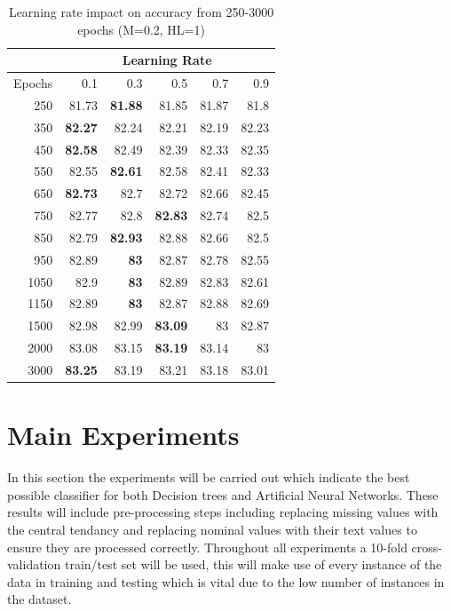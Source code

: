 \documentclass[12pt]{article}
\begin{document}
      \begin{table}[H]
        \centering
        \caption{Learning rate impact on accuracy from 250-3000 epochs (M=0.2, HL=1)}
          \begin{tabular}{r|rrrrr}
          \toprule
                & \multicolumn{5}{c}{Learning Rate} \\
          \midrule
          \multicolumn{1}{l|}{Epochs} & 0.1   & 0.3   & 0.5   & 0.7   & 0.9 \\
          \midrule
          250   & 81.73 & \textbf{81.88} & 81.85 & 81.87 & 81.8 \\
          350   & \textbf{82.27} & 82.24 & 82.21 & 82.19 & 82.23 \\
          450   & \textbf{82.58} & 82.49 & 82.39 & 82.33 & 82.35 \\
          550   & 82.55 & \textbf{82.61} & 82.58 & 82.41 & 82.33 \\
          650   & \textbf{82.73} & 82.7  & 82.72 & 82.66 & 82.45 \\
          750   & 82.77 & 82.8  & \textbf{82.83} & 82.74 & 82.5 \\
          850   & 82.79 & \textbf{82.93} & 82.88 & 82.66 & 82.5 \\
          950   & 82.89 & \textbf{83} & 82.87 & 82.78 & 82.55 \\
          1050  & 82.9  & \textbf{83} & 82.89 & 82.83 & 82.61 \\
          1150  & 82.89 & \textbf{83} & 82.87 & 82.88 & 82.69 \\
          1500  & 82.98 & 82.99 & \textbf{83.09} & 83    & 82.87 \\
          2000  & 83.08 & 83.15 & \textbf{83.19} & 83.14 & 83 \\
          3000  & \textbf{83.25} & 83.19 & 83.21 & 83.18 & 83.01 \\
          \bottomrule
          \end{tabular}%
        \label{tab:addlabel}%
      \end{table}%

\newpage
\section{Main Experiments}
  In this section the experiments will be carried out which indicate the best possible classifier for both Decision trees and Artificial Neural Networks. These results will include pre-processing steps including replacing missing values with the central tendancy and replacing nominal values with their text values to ensure they are processed correctly. Throughout all experiments a 10-fold cross-validation train/test set will be used, this will make use of every instance of the data in training and testing which is vital due to the low number of instances in the dataset.
\end{document}
